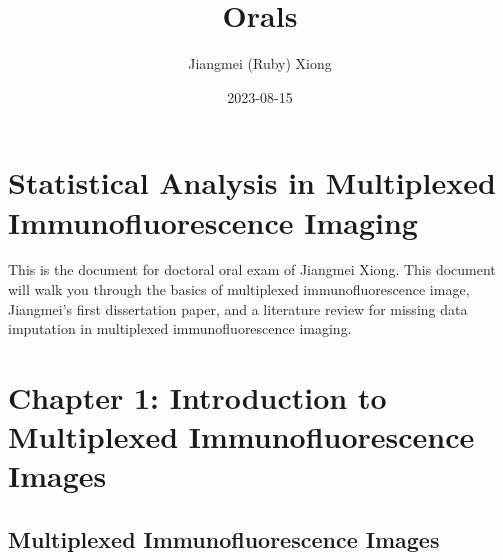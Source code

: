 \documentclass[
  letterpaper,
  DIV=11,
  numbers=noendperiod,
  oneside]{scrreprt}
\title{Orals}
\author{Jiangmei (Ruby) Xiong}
\date{2023-08-15}
\renewcommand*\contentsname{Table of contents}
\newcommand\contentsname{Table of contents}
\begin{document}
\maketitle
\ifdefined\Shaded\renewenvironment{Shaded}{\begin{tcolorbox}[boxrule=0pt, frame hidden, interior hidden, borderline west={3pt}{0pt}{shadecolor}, sharp corners, enhanced, breakable]}{\end{tcolorbox}}\fi

\renewcommand*\contentsname{Table of contents}
{
\hypersetup{linkcolor=}
\setcounter{tocdepth}{2}
\tableofcontents
}

\hypertarget{statistical-analysis-in-multiplexed-immunofluorescence-imaging}{%
\chapter*{Statistical Analysis in Multiplexed Immunofluorescence
Imaging}\label{statistical-analysis-in-multiplexed-immunofluorescence-imaging}}


This is the document for doctoral oral exam of Jiangmei Xiong. This
document will walk you through the basics of multiplexed
immunofluorescence image, Jiangmei's first dissertation paper, and a
literature review for missing data imputation in multiplexed
immunofluorescence imaging.


\hypertarget{chapter-1-introduction-to-multiplexed-immunofluorescence-images}{%
\chapter{Chapter 1: Introduction to Multiplexed Immunofluorescence
Images}\label{chapter-1-introduction-to-multiplexed-immunofluorescence-images}}

\hypertarget{multiplexed-immunofluorescence-images}{%
\section{Multiplexed Immunofluorescence
Images}\label{multiplexed-immunofluorescence-images}}
\end{document}
